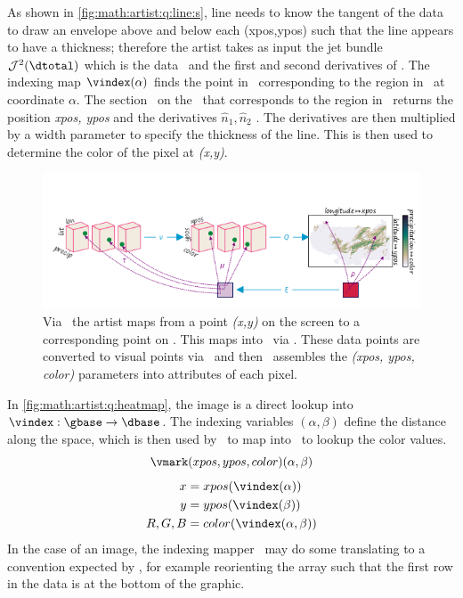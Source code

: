 \documentclass[../main.tex]{subfiles}
\begin{document}
As shown in \autoref{fig:math:artist:q:line:s}, line needs to know the tangent of the data to draw an envelope above and below each (xpos,ypos) such that the line appears to have a thickness; therefore the artist takes as input the jet bundle \cite{JetBundle2020,musilovaCalculusVariationsJet2016} $\mathcal{J}^{2}(\dtotal)$ which is the data \dtotal\ and the first and second derivatives of \dtotal. The indexing map $\vindex(\alpha)$ finds the point in \dbase\ corresponding to the region in \gbase\ at coordinate $\alpha$. The section \dsection\ on the \dbasepoint\ that corresponds to the region in \gbase\ returns the position \textit{xpos, ypos} and the derivatives $\hat{n}_1, \hat{n}_2$ . The derivatives are then multiplied by a width parameter to specify the thickness of the line. This is then used to determine the color of the pixel at \textit{(x,y)}.  

\begin{figure}[H]
    \includegraphics[width=\textwidth]{figures/math/image.png}
    \caption{Via \vindex\, the artist maps from a point \textit{(x,y)} on the screen to a corresponding point on \dbase. This maps into \dfiber\ via \dsection. These data points are converted to visual points via \vchannel\, and then \vmark\ assembles the \textit{(xpos, ypos, color)} parameters into attributes of each pixel. }
    \label{fig:math:artist:q:heatmap}
\end{figure}
In \autoref{fig:math:artist:q:heatmap}, the image is a direct lookup into  $\vindex:\gbase\rightarrow\dbase$. The indexing variables $(\alpha, \beta)$ define the distance along the space, which is then used by \vindex\ to map into \dbase\ to lookup the color values.
\begin{equation}
    \vmark(xpos, ypos, color)(\alpha, \beta)
    \label{eq:math:artist:q:image}
    \end{equation}
\begin{align*}
x &= xpos(\vindex(\alpha))\\
y &= ypos(\vindex(\beta))\\
R, G, B &= color(\vindex(\alpha, \beta))
\end{align*}
In the case of an image, the indexing mapper \vindex\ may do some translating to a convention expected by \vmark, for example reorienting the array such that the first row in the data is at the bottom of the graphic. 
\end{document}
